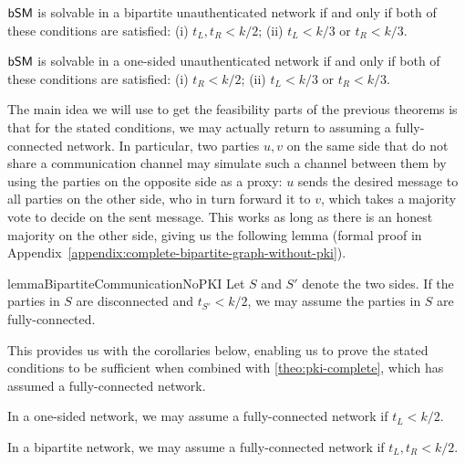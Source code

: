 \begin{theorem}\label{theorem:main:no-pki-bipartite}
$\textsf{bSM}$ is solvable in a bipartite unauthenticated network if and only if both of these conditions are satisfied: (i) $t_L, t_R < k/2$; (ii) $t_L < k/3$ or $t_R < k/3$.
\end{theorem}

\begin{theorem}\label{theorem:main:no-pki-one-sided} $\textsf{bSM}$ is solvable in a one-sided unauthenticated network if and only if both of these conditions are satisfied: (i) $t_R < k/2$; (ii)  $t_L < k/3$ or $t_R < k/3$.
\end{theorem}


The main idea we will use to get the feasibility parts of the previous theorems 
is that for the stated conditions, we may actually return to assuming
a fully-connected network.
In particular, two parties $u, v$ on the same side that do not share a communication channel may simulate such a channel between them by using the parties on the opposite side as a proxy: $u$ sends the desired message to all parties on the other side, who in turn forward it to $v$, which takes a majority vote to decide on the sent message. This works as long as there is an honest majority on the other side, giving us the following lemma (formal proof in 
Appendix~\ref{appendix:complete-bipartite-graph-without-pki}).
\begin{restatable}{lemma}{BipartiteCommunicationNoPKI}\label{lemma:pki-bipartite}
Let $S$ and $S'$ denote the two sides.
If the parties in $S$ are disconnected and $t_{S'} < k /2$, we may assume the parties in $S$ are fully-connected.
\end{restatable}

This provides us with the corollaries below, enabling us to prove the stated conditions to be sufficient when combined with \cref{theo:pki-complete}, which has assumed a fully-connected network.
\begin{corollary}\label{lemma:pki-one-sided}
In a one-sided network, we may assume a fully-connected network if $t_L < k / 2$.
\end{corollary}
\begin{corollary}\label{lemma:pki-complete}
In a bipartite network, we may assume a fully-connected network if $t_L, t_R < k/2$.
\end{corollary}

